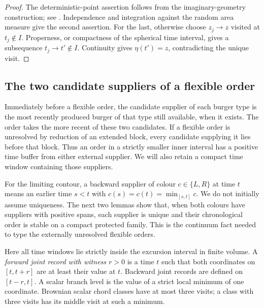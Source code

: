 \begin{proof}
The deterministic-point assertion follows from the imaginary-geometry
construction; see \cite[Section 2.4, property (vi)]{BorgaGwynneSunPermutons}.
Independence and integration against the random area measure give the
second assertion.  For the last, otherwise choose $z_j\to z$ visited at
$t_j\notin I$.  Properness, or compactness of the spherical time interval,
gives a subsequence $t_j\to t'\notin I$.  Continuity gives
$\eta(t')=z$, contradicting the unique visit.
\end{proof}

\subsection{The two candidate suppliers of a flexible order}

Immediately before a flexible order, the candidate supplier of each
burger type is the most recently produced burger of that type still
available, when it exists.  The order takes the more recent of these
two candidates.  If a flexible order is unresolved by reduction of an
extended block, every candidate supplying it lies before that block.
Thus an order in a strictly smaller inner interval has a positive time
buffer from either external supplier.  We will also retain a compact
time window containing those suppliers.

For the limiting contour, a backward supplier of colour $c\in\{L,R\}$
at time $t$ means an earlier time $s<t$ with
$c(s)=c(t)=\min_{[s,t]}c$.  We do not initially assume uniqueness.
The next two lemmas show that, when both colours have suppliers with
positive spans, each supplier is unique and their chronological order
is stable on a compact protected family.  This is the continuum fact
needed to type the externally unresolved flexible orders.

Here all time windows lie strictly inside the excursion interval in finite
volume.  A \emph{forward joint record with witness $r>0$} is a time $t$
such that both coordinates on $[t,t+r]$ are at least their value at $t$.
Backward joint records are defined on $[t-r,t]$.  A scalar branch level is
the value of a strict local minimum of one coordinate.  Brownian scalar
chord classes have at most three visits; a class with three visits has
its middle visit at such a minimum.

